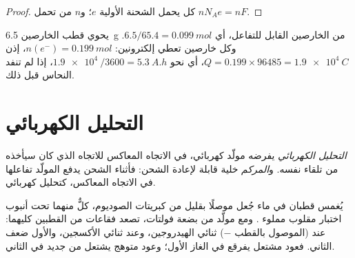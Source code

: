 \begin{proof}
كل  يحمل الشحنة الأولية $e$؛ و$n$  من 
تحمل $n N_A e = n F$.
\end{proof}

\begin{example}\label{ex:g12:cells-and-electrolysis:capacity}
يحوي قطب الخارصين \qty{6.5}{g} من الخارصين القابل للتفاعل، أي
$6.5/65.4 = \qty{0.099}{mol}$. وكل  خارصين تعطي إلكترونين:
$n(e^-) = \qty{0.199}{mol}$، إذن $Q = 0.199 \times 96485 = \qty{1.9e4}{C}$،
أي نحو $\qty{1.9e4}{}/3600 = \qty{5.3}{A.h}$، إذا لم تنفد 
النحاس قبل ذلك.
\end{example}

\section{التحليل الكهربائي}

\begin{definition}\label{def:g12:cells-and-electrolysis:electrolysis}
\emph{التحليل الكهربائي}  يفرضه
مولّد كهربائي، في الاتجاه المعاكس للاتجاه الذي كان
سيأخذه من تلقاء نفسه. و\emph{المركم} خلية
قابلة لإعادة الشحن: فأثناء الشحن يدفع المولّد تفاعلها
في الاتجاه المعاكس، كتحليل كهربائي.
\end{definition}

\begin{inthelab}
يُغمس قطبان في ماء جُعل موصلًا بقليل من كبريتات
الصوديوم، كلٌّ منهما تحت أنبوب اختبار مقلوب مملوء . ومع
مولّد من بضعة فولتات، تصعد فقاعات من القطبين كليهما: عند
 (الموصول بالقطب $-$) ثنائي الهيدروجين، وعند 
ثنائي الأكسجين، والأول ضعف الثاني. فعود مشتعل
يفرقع في الغاز الأول؛ وعود متوهج يشتعل من جديد في الثاني.
\end{inthelab}

